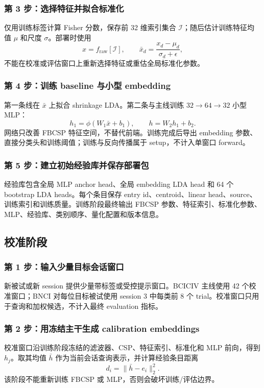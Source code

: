 \documentclass[
    TwoSide=false,
    Degree=graduate,
    GradLevel=master,
    Type=thesis,
    Title={光电混合运动想象脑机接口技术文档}
]{zjuthesis}
\begin{document}
\subsubsection{第 3 步：选择特征并拟合标准化}
仅用训练标签计算 Fisher 分数，保存前 32 维索引集合 $\mathcal I$；随后估计训练特征均值 $\mu$ 和尺度 $\sigma$。部署时使用
\begin{equation}
x=f_{\mathrm{raw}}[\mathcal I],\qquad \bar{x}_d=\frac{x_d-\mu_d}{\sigma_d+\epsilon},
\end{equation}
不能在校准或评估窗口上重新选择特征或重估全局标准化参数。

\subsubsection{第 4 步：训练 baseline 与小型 embedding}
第一条线在 $\bar{x}$ 上拟合 shrinkage LDA。第二条与主线训练 $32\rightarrow64\rightarrow32$ 小型 MLP：
\begin{equation}
h_1=\phi(W_1\bar{x}+b_1),\qquad h=W_2h_1+b_2.
\end{equation}
网络只改善 FBCSP 特征空间，不替代前端。训练完成后导出 embedding 参数、直接分类头和训练阈值；训练与反向传播属于 setup，不计入单窗口 forward。

\subsubsection{第 5 步：建立初始经验库并保存部署包}
经验库包含全局 MLP anchor head、全局 embedding LDA head 和 64 个 bootstrap LDA heads。每个条目保存 entry id、centroid、linear head、source、训练索引和训练质量。训练阶段最终输出 FBCSP 参数、特征索引、标准化参数、MLP、经验库、类别顺序、量化配置和版本信息。

\subsection{校准阶段}
\subsubsection{第 1 步：输入少量目标会话窗口}
新被试或新 session 提供少量带标签或受控提示窗口。BCICIV 主线使用 42 个校准窗口；BNCI 对每位目标被试使用 session 3 中每类前 8 个 trial。校准窗口只用于查询和加权候选，不计入最终 evaluation 指标。

\subsubsection{第 2 步：用冻结主干生成 calibration embeddings}
校准窗口沿训练阶段冻结的滤波器、CSP、特征索引、标准化和 MLP 前向，得到 $h_j$。取其均值 $\bar h$ 作为当前会话查询表示，并计算经验条目距离
\begin{equation}
d_i=\|\bar h-e_i\|_2^2.
\end{equation}
该阶段不能重新训练 FBCSP 或 MLP，否则会破坏训练/评估边界。
\end{document}
